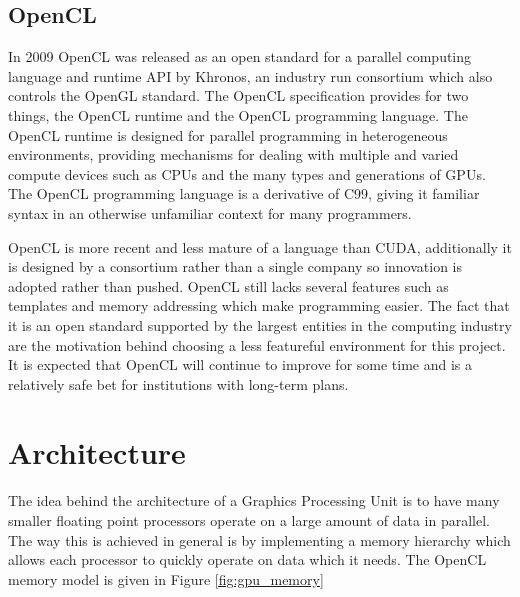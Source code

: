 \subsection{OpenCL}

In 2009 OpenCL was released as an open standard for a parallel computing
language and runtime API by Khronos, an industry run consortium which also
controls the OpenGL standard.\cite{OpenCL} The OpenCL specification provides
for two things, the OpenCL runtime and the OpenCL programming language. The
OpenCL runtime is designed for parallel programming in heterogeneous
environments, providing mechanisms for dealing with multiple and varied compute
devices such as CPUs and the many types and generations of GPUs.  The OpenCL
programming language is a derivative of C99, giving it familiar syntax in an
otherwise unfamiliar context for many programmers.


OpenCL is more recent and less mature of a language than CUDA, additionally it
is designed by a consortium rather than a single company so innovation is
adopted rather than pushed. OpenCL still lacks several features such as
templates and memory addressing which make programming easier. The fact that it
is an open standard supported by the largest entities in the computing industry
are the motivation behind choosing a less featureful environment for this
project. It is expected that OpenCL will continue to improve for some time and
is a relatively safe bet for institutions with long-term plans.



\section{Architecture}
The idea behind the architecture of a Graphics Processing Unit is to have many
smaller floating point processors operate on a large amount of data in
parallel.
The way this is achieved in general is by implementing a memory hierarchy which
allows each processor to quickly operate on data which it needs. The OpenCL 
memory model is given in Figure \ref{fig:gpu_memory}

